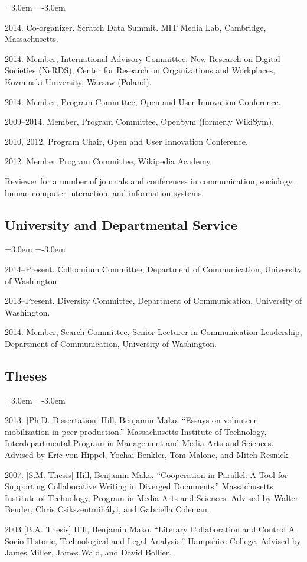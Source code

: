 \documentclass[10pt]{article}
\newenvironment{cvlist}{
\begin{list}{}{\leftmargin=3.0em \itemindent=-3.0em}
  \setlength{\itemsep}{0pt}
  \setlength{\parskip}{0em}
  \setlength{\parsep}{1em}
  \setlength{\parindent}{0em}}
{\vspace{1em}
\end{list}}
\begin{document}
\begin{cvlist}
\item 2014. Co-organizer. Scratch Data Summit. MIT Media Lab, Cambridge, Massachusetts.
\item 2014. Member, International Advisory Committee. New Research on Digital Societies (NeRDS), Center for Research on Organizations and Workplaces, Kozminski University, Warsaw (Poland).
\item 2014. Member, Program Committee, Open and User Innovation Conference.
\item 2009--2014. Member, Program Committee, OpenSym (formerly WikiSym).
\item 2010, 2012. Program Chair, Open and User Innovation Conference.
\item 2012. Member Program Committee, Wikipedia Academy.
\item Reviewer for a number of journals and conferences in communication, sociology, human computer interaction, and information systems.
\end{cvlist}

\subsection{University and Departmental Service}
\begin{cvlist}
\item 2014--Present. Colloquium Committee, Department of Communication, University of Washington.
\item 2013--Present. Diversity Committee, Department of Communication, University of Washington.
\item 2014. Member, Search Committee, Senior Lecturer in Communication Leadership, Department of Communication, University of Washington.
\end{cvlist}

\subsection{Theses}

\begin{cvlist}
\item 2013. [Ph.D. Dissertation] Hill, Benjamin Mako. ``Essays on volunteer mobilization in peer production.'' Massachusetts Institute of Technology, Interdepartmental Program in Management and Media Arts and Sciences. Advised by Eric von Hippel, Yochai Benkler, Tom Malone, and Mitch Resnick.
\item 2007. [S.M. Thesis] Hill, Benjamin Mako. ``Cooperation in Parallel: A Tool for Supporting Collaborative Writing in Diverged Documents.'' Massachusetts Institute of Technology, Program in Media Arts and Sciences. Advised by Walter Bender, Chris Csikszentmihályi, and Gabriella Coleman.
\item 2003 [B.A. Thesis] Hill, Benjamin Mako. ``Literary Collaboration and Control A Socio-Historic, Technological and Legal Analysis.'' Hampshire College. Advised by James Miller, James Wald, and David Bollier.
\end{cvlist}
\end{document}
